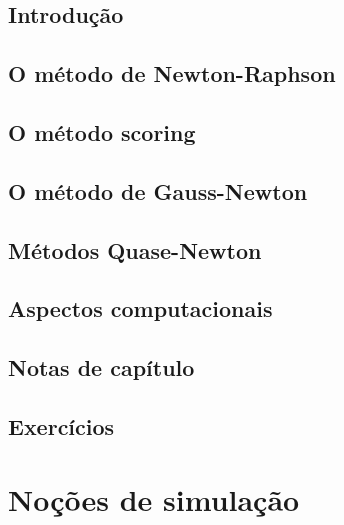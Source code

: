 \documentclass[
]{latex/krantz}
\theoremstyle{definition}
\theoremstyle{definition}
\theoremstyle{definition}
\theoremstyle{definition}
\theoremstyle{remark}
\begin{document}
\hypertarget{introduuxe7uxe3o-13}{%
\section{Introdução}\label{introduuxe7uxe3o-13}}

\hypertarget{o-muxe9todo-de-newton-raphson}{%
\section{O método de Newton-Raphson}\label{o-muxe9todo-de-newton-raphson}}

\hypertarget{o-muxe9todo-scoring}{%
\section{O método scoring}\label{o-muxe9todo-scoring}}

\hypertarget{o-muxe9todo-de-gauss-newton}{%
\section{O método de Gauss-Newton}\label{o-muxe9todo-de-gauss-newton}}

\hypertarget{muxe9todos-quase-newton}{%
\section{Métodos Quase-Newton}\label{muxe9todos-quase-newton}}

\hypertarget{aspectos-computacionais}{%
\section{Aspectos computacionais}\label{aspectos-computacionais}}

\hypertarget{notas-de-capuxedtulo-13}{%
\section{Notas de capítulo}\label{notas-de-capuxedtulo-13}}

\hypertarget{exercuxedcios-13}{%
\section{Exercícios}\label{exercuxedcios-13}}

\hypertarget{nouxe7uxf5es-de-simulauxe7uxe3o}{%
\chapter{Noções de simulação}\label{nouxe7uxf5es-de-simulauxe7uxe3o}}
\end{document}
